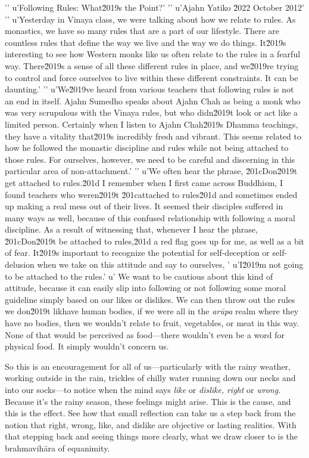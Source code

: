 '\n'
u'Following Rules: What\u2019s the Point?'
'\n'
u'Ajahn Yatiko \u2022 October 2012'
'\n'
u'Yesterday in Vinaya class, we were talking about how we relate to rules. As monastics, we have so many rules that are a part of our lifestyle. There are countless rules that define the way we live and the way we do things. It\u2019s interesting to see how Western monks like us often relate to the rules in a fearful way. There\u2019s a sense of all these different rules in place, and we\u2019re trying to control and force ourselves to live within these different constraints. It can be daunting.'
'\n'
u'We\u2019ve heard from various teachers that following rules is not an end in itself. Ajahn Sumedho speaks about Ajahn Chah as being a monk who was very scrupulous with the Vinaya rules, but who didn\u2019t look or act like a limited person. Certainly when I listen to Ajahn Chah\u2019s Dhamma teachings, they have a vitality that\u2019s incredibly fresh and vibrant. This seems related to how he followed the monastic discipline and rules while not being attached to those rules. For ourselves, however, we need to be careful and discerning in this particular area of non-attachment.'
'\n'
u'We often hear the phrase, \u201cDon\u2019t get attached to rules.\u201d I remember when I first came across Buddhism, I found teachers who weren\u2019t \u201cattached to rules\u201d and sometimes ended up making a real mess out of their lives. It seemed their disciples suffered in many ways as well, because of this confused relationship with following a moral discipline. As a result of witnessing that, whenever I hear the phrase, \u201cDon\u2019t be attached to rules,\u201d a red flag goes up for me, as well as a bit of fear. It\u2019s important to recognize the potential for self-deception or self-delusion when we take on this attitude and say to ourselves, '
u'I\u2019m not going to be attached to the rules.'
u' We want to be cautious about this kind of attitude, because it can easily slip into following or not following some moral guideline simply based on our likes or dislikes. We can then throw out the rules we don\u2019t likhave human bodies, if we were all in the \emph{arūpa} realm 
where they have no bodies, then we wouldn't relate to fruit, 
vegetables, or meat in this way. None of that would be perceived as 
food---there wouldn't even be a word for physical food. It simply 
wouldn't concern us.

So this is an encouragement for all of us---particularly with the rainy 
weather, working outside in the rain, trickles of chilly water running 
down our necks and into our socks---to notice when the mind says 
\emph{like} or \emph{dislike,} \emph{right} or \emph{wrong.} Because 
it's the rainy season, these feelings might arise. This is the cause, 
and this is the effect. See how that small reflection can take us a 
step back from the notion that right, wrong, like, and dislike are 
objective or lasting realities. With that stepping back and seeing 
things more clearly, what we draw closer to is the brahmavihāra of 
equanimity.

